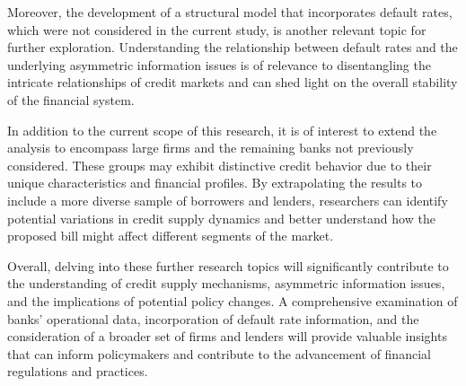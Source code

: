 \documentclass[11pt, oneside]{book}
\begin{document}
Moreover, the development of a structural model that incorporates default rates, which were not considered in the current study, is another relevant topic for further exploration. Understanding the relationship between default rates and the underlying asymmetric information issues is of relevance to disentangling the intricate relationships of credit markets and can shed light on the overall stability of the financial system.

In addition to the current scope of this research, it is of interest to extend the analysis to encompass large firms and the remaining banks not previously considered. These groups may exhibit distinctive credit behavior due to their unique characteristics and financial profiles. By extrapolating the results to include a more diverse sample of borrowers and lenders, researchers can identify potential variations in credit supply dynamics and better understand how the proposed bill might affect different segments of the market.

Overall, delving into these further research topics will significantly contribute to the understanding of credit supply mechanisms, asymmetric information issues, and the implications of potential policy changes. A comprehensive examination of banks' operational data, incorporation of default rate information, and the consideration of a broader set of firms and lenders will provide valuable insights that can inform policymakers and contribute to the advancement of financial regulations and practices.




%
%
%



\cleardoublepage
{}
{}

\renewcommand\bibname {References}
\end{document}
